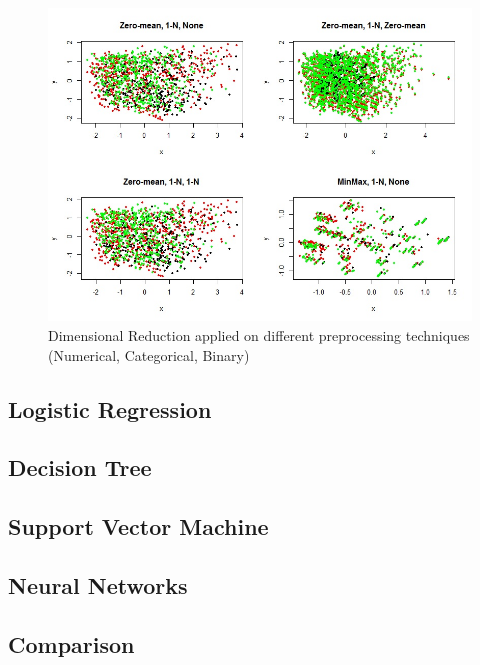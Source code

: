 \begin{figure}
	\center
	\includegraphics[scale=\figurescaling]{figures/db1/dim_reduction.jpg}
	\caption{Dimensional Reduction applied on different preprocessing techniques (Numerical, Categorical, Binary)
	\label{fig:db1-dimred}}
\end{figure}


\subsection{Logistic Regression}

\subsection{Decision Tree}

\subsection{Support Vector Machine}

\subsection{Neural Networks}

\subsection{Comparison}
